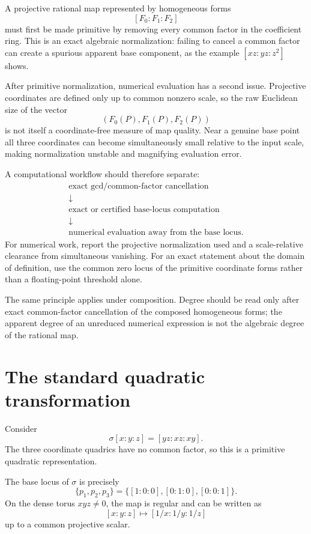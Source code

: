 \begin{remark}
A projective rational map represented by homogeneous forms
\[
[F_0:F_1:F_2]
\]
must first be made primitive by removing every common factor in the coefficient
ring. This is an exact algebraic normalization: failing to cancel a common
factor can create a spurious apparent base component, as the example
\([xz:yz:z^2]\) shows.

After primitive normalization, numerical evaluation has a second issue.
Projective coordinates are defined only up to common nonzero scale, so the raw
Euclidean size of the vector
\[
(F_0(P),F_1(P),F_2(P))
\]
is not itself a coordinate-free measure of map quality. Near a genuine base
point all three coordinates can become simultaneously small relative to the
input scale, making normalization unstable and magnifying evaluation error.

A computational workflow should therefore separate:
\[
\begin{gathered}
\text{exact gcd/common-factor cancellation}\\
\downarrow\\
\text{exact or certified base-locus computation}\\
\downarrow\\
\text{numerical evaluation away from the base locus}.
\end{gathered}
\]
For numerical work, report the projective normalization used and a
scale-relative clearance from simultaneous vanishing. For an exact statement
about the domain of definition, use the common zero locus of the primitive
coordinate forms rather than a floating-point threshold alone.

The same principle applies under composition. Degree should be read only
after exact common-factor cancellation of the composed homogeneous forms;
the apparent degree of an unreduced numerical expression is not the algebraic
degree of the rational map.
\end{remark}

\section{The standard quadratic transformation}

Consider
\[
  \sigma[x:y:z]=[yz:xz:xy].
\]
The three coordinate quadrics have no common factor, so this is a primitive quadratic representation.

\begin{proposition}\label{prop:vi44-sigma-domain}
The base locus of \(\sigma\) is precisely
\[
  \{p_1,p_2,p_3\}
  =\{[1:0:0],[0:1:0],[0:0:1]\}.
\]
On the dense torus \(xyz\neq0\), the map is regular and can be written as
\[
  [x:y:z]\longmapsto[1/x:1/y:1/z]
\]
up to a common projective scalar.
\end{proposition}

